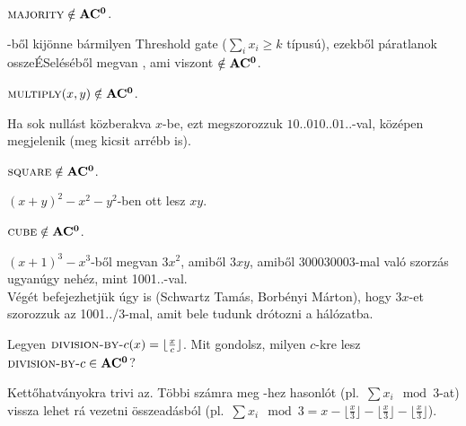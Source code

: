 \begin{Exercise}[counter={sorszam}, difficulty=0]
	$\la{Majority}\notin\ACnull$.
\end{Exercise}
\begin{Answer}
	-b\H ol kij\"onne b\'armilyen Threshold gate ($\sum_i x_i\ge k$ t\'ipus\'u), ezekb\H ol p\'aratlanok ossze\'ESel\'es\'eb\H ol megvan , ami viszont $\notin\mbox{\ensuremath{\mathbf{AC^0}}}$.
\end{Answer}

\begin{Exercise}[counter={sorszam}, difficulty=0]
	$\la{Multiply}(x,y)\notin\ACnull$.
\end{Exercise}
\begin{Answer}
	Ha sok null\'ast k\"ozberakva $x$-be, ezt megszorozzuk $10..010..01..$-val, k\"oz\'epen megjelenik  (meg kicsit arr\'ebb  is).
\end{Answer}

\begin{Exercise}[counter={sorszam}, difficulty=0]
	$\la{Square}\notin\ACnull$.
\end{Exercise}
\begin{Answer}
	$(x+y)^2-x^2-y^2$-ben ott lesz $xy$.
\end{Answer}

\begin{Exercise}[counter={sorszam}, difficulty=0]
	$\la{Cube}\notin\ACnull$.
\end{Exercise}
\begin{Answer}
	$(x+1)^3-x^3$-b\H ol megvan $3x^2$, amib\H ol $3xy$, amib\H ol 300030003-mal val\'o szorz\'as ugyan\'ugy neh\'ez, mint 1001..-val.\\
	V\'eg\'et befejezhetj\" uk \'ugy is (Schwartz Tam\'as, Borb\'enyi M\'arton), hogy $3x$-et szorozzuk az 1001../3-mal, amit bele tudunk dr\'otozni a h\'al\'ozatba.
\end{Answer}

\begin{Exercise}[counter={sorszam}, difficulty=0]
	Legyen $\la{Division-by-}c(x)=\lfloor \frac xc\rfloor$.
	Mit gondolsz, milyen $c$-kre lesz $\la{Division-by-}c\in\ACnull$?
\end{Exercise}
\begin{Answer}
	Kett\H ohatv\'anyokra trivi az. T\"obbi sz\'amra meg -hez hasonl\'ot (pl.\ $\sum x_i \mod 3$-at) vissza lehet r\'a vezetni \"osszead\'asb\'ol (pl.\ $\sum x_i \mod 3=x-\lfloor \frac x3\rfloor-\lfloor \frac x3\rfloor-\lfloor \frac x3\rfloor$).
\end{Answer}

